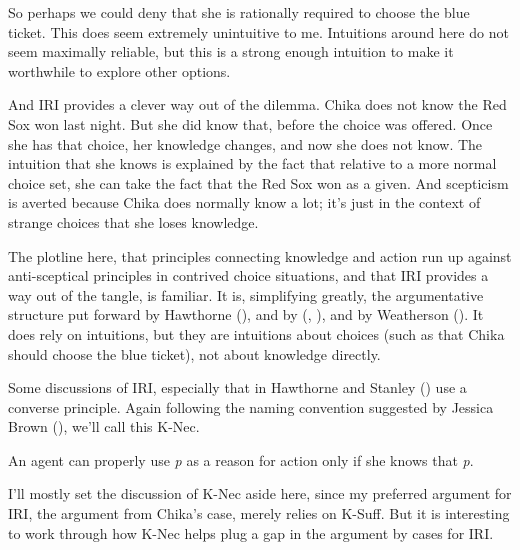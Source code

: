 \documentclass[
  11pt,
  letterpaper,
  DIV=11,
  numbers=noendperiod,
  twoside]{scrartcl}
\providecommand{\tightlist}{%
  \setlength{\itemsep}{0pt}\setlength{\parskip}{0pt}}
\begin{document}
So perhaps we could deny that she is rationally required to choose the
blue ticket. This does seem extremely unintuitive to me. Intuitions
around here do not seem maximally reliable, but this is a strong enough
intuition to make it worthwhile to explore other options.

And IRI provides a clever way out of the dilemma. Chika does not know
the Red Sox won last night. But she did know that, before the choice was
offered. Once she has that choice, her knowledge changes, and now she
does not know. The intuition that she knows is explained by the fact
that relative to a more normal choice set, she can take the fact that
the Red Sox won as a given. And scepticism is averted because Chika does
normally know a lot; it's just in the context of strange choices that
she loses knowledge.

The plotline here, that principles connecting knowledge and action run
up against anti-sceptical principles in contrived choice situations, and
that IRI provides a way out of the tangle, is familiar. It is,
simplifying greatly, the argumentative structure put forward by
Hawthorne (), and by
(,
), and by Weatherson
(). It does rely on intuitions, but
they are intuitions about choices (such as that Chika should choose the
blue ticket), not about knowledge directly.

Some discussions of IRI, especially that in Hawthorne and Stanley
() use a converse principle.
Again following the naming convention suggested by Jessica Brown
(), we'll call this K-Nec.

\begin{description}
\tightlist
\item[K-Nec]
An agent can properly use \emph{p} as a reason for action only if she
knows that \emph{p}.
\end{description}

I'll mostly set the discussion of K-Nec aside here, since my preferred
argument for IRI, the argument from Chika's case, merely relies on
K-Suff. But it is interesting to work through how K-Nec helps plug a gap
in the argument by cases for IRI.
\end{document}
